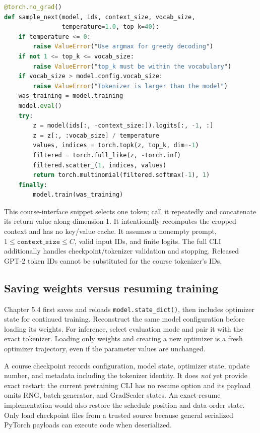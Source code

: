 \begin{lstlisting}[language=Python]
@torch.no_grad()
def sample_next(model, ids, context_size, vocab_size,
                temperature=1.0, top_k=40):
    if temperature <= 0:
        raise ValueError("Use argmax for greedy decoding")
    if not 1 <= top_k <= vocab_size:
        raise ValueError("top_k must be within the vocabulary")
    if vocab_size > model.config.vocab_size:
        raise ValueError("Tokenizer is larger than the model")
    was_training = model.training
    model.eval()
    try:
        z = model(ids[:, -context_size:]).logits[:, -1, :]
        z = z[:, :vocab_size] / temperature
        values, indices = torch.topk(z, top_k, dim=-1)
        filtered = torch.full_like(z, -torch.inf)
        filtered.scatter_(1, indices, values)
        return torch.multinomial(filtered.softmax(-1), 1)
    finally:
        model.train(was_training)
\end{lstlisting}
This course-interface snippet selects one token; call it repeatedly and
concatenate its return value along dimension 1. It intentionally recomputes the
cropped context and has no key/value cache. It assumes a nonempty prompt,
$1\le\texttt{context\_size}\le C$, valid input IDs, and finite logits. The
full CLI additionally handles checkpoint/tokenizer validation and stopping.
Released GPT-2 token IDs cannot be substituted for the course tokenizer's IDs.

\subsection{Saving weights versus resuming training}
Chapter 5.4 first saves and reloads \texttt{model.state\_dict()}, then includes
optimizer state for continued training. Reconstruct the same model configuration
before loading its weights. For inference, select evaluation mode and pair it
with the exact tokenizer. Loading only weights and creating a new optimizer is
a fresh optimizer trajectory, even if the parameter values are unchanged.

A course checkpoint records configuration, model state, optimizer state, update
number, and metadata including the tokenizer identity. It does \emph{not} yet
provide exact restart: the current pretraining CLI has no resume option and its
payload omits RNG, batch-generator, and GradScaler states. An exact-resume
implementation would also restore the schedule position and data-order state.
Only load checkpoint files from a trusted source because general serialized
PyTorch payloads can execute code when deserialized.

